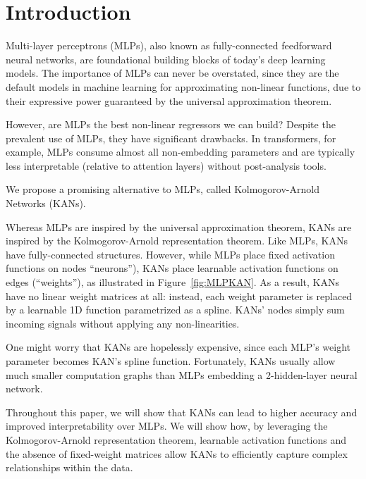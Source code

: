 \documentclass[12pt,a4paper]{article}
\begin{document}


\section{Introduction}
\label{sec:in}
Multi-layer perceptrons (MLPs), also known as fully-connected feedforward neural networks, are foundational building blocks of today’s deep learning models. The importance of MLPs can never be overstated, since they are the default models in machine learning for approximating non-linear functions, due to their expressive power guaranteed by the universal approximation theorem. 

However, are MLPs the best non-linear regressors we can build? Despite the prevalent use of MLPs, they have significant drawbacks. In transformers, for example, MLPs consume almost all non-embedding parameters and are typically less interpretable (relative to attention layers) without post-analysis tools.

We propose a promising alternative to MLPs, called Kolmogorov-Arnold Networks (KANs). 

Whereas MLPs are inspired by the universal approximation theorem, KANs are inspired by the Kolmogorov-Arnold representation theorem. Like MLPs, KANs have fully-connected structures. However, while MLPs place fixed activation functions on nodes “neurons”), KANs place learnable activation functions on edges (“weights”), as illustrated in Figure~\ref{fig:MLPKAN}. As a result, KANs have no linear weight matrices at all: instead, each weight parameter is replaced by a learnable 1D function parametrized as a spline. KANs’ nodes simply sum incoming signals without applying any non-linearities. 

One might worry that KANs are hopelessly expensive, since each MLP’s weight parameter becomes KAN’s spline function. Fortunately, KANs usually allow much smaller computation graphs than MLPs embedding a 2-hidden-layer neural network.

Throughout this paper, we will show that KANs can lead to higher accuracy and improved interpretability over MLPs. We will show how, by leveraging the Kolmogorov-Arnold representation theorem, learnable activation functions and the absence of fixed-weight matrices allow KANs to efficiently capture complex relationships within the data\cite{KAN}.
\end{document}
